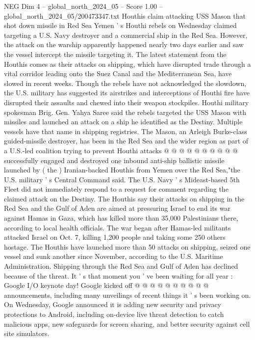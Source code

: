 \begin{textsample}{NEG Dim 4 – global\_north\_2024\_05 – Score 1.00 – global\_north\_2024\_05/200473347.txt}  \label{ex:f4_neg_118}
Houthis claim attacking USS Mason that shot down missile in Red Sea Yemen ' s Houthi rebels on Wednesday claimed targeting a U.S.
Navy destroyer and a commercial ship in the Red Sea.
However, the attack on the warship apparently happened nearly two days earlier and saw the vessel intercept the missile targeting it.
The latest statement from the Houthis comes as their attacks on shipping, which have disrupted trade through a vital corridor leading onto the Suez Canal and the Mediterranean Sea, have slowed in recent weeks.
Though the rebels have not acknowledged the slowdown, the U.S. military has suggested its airstrikes and interceptions of Houthi fire have disrupted their assaults and chewed into their weapon stockpiles.
Houthi military spokesman Brig.
Gen.
Yahya Saree said the rebels targeted the USS Mason with missiles and launched an attack on a ship he identified as the Destiny.
Multiple vessels have that name in shipping registries.
The Mason, an Arleigh Burke-class guided-missile destroyer, has been in the Red Sea and the wider region as part of a U.S.-led coalition trying to prevent Houthi attacks @ @ @ @ @ @ @ @ @ @ successfully engaged and destroyed one inbound anti-ship ballistic missile launched by ( the ) Iranian-backed Houthis from Yemen over the Red Sea,"the U.S. military ' s Central Command said.
The U.S.
Navy ' s Mideast-based 5th Fleet did not immediately respond to a request for comment regarding the claimed attack on the Destiny.
The Houthis say their attacks on shipping in the Red Sea and the Gulf of Aden are aimed at pressuring Israel to end its war against Hamas in Gaza, which has killed more than 35,000 Palestinians there, according to local health officials.
The war began after Hamas-led militants attacked Israel on Oct. 7, killing 1,200 people and taking some 250 others hostage.
The Houthis have launched more than 50 attacks on shipping, seized one vessel and sunk another since November, according to the U.S.
Maritime Administration.
Shipping through the Red Sea and Gulf of Aden has declined because of the threat.
It ' s that moment you ' ve been waiting for all year : Google I/O keynote day!
Google kicked off @ @ @ @ @ @ @ @ @ @ announcements, including many unveilings of recent things it ' s been working on.
On Wednesday, Google announced it is adding new security and privacy protections to Android, including on-device live threat detection to catch malicious apps, new safeguards for screen sharing, and better security against cell site simulators.

\end{textsample}
